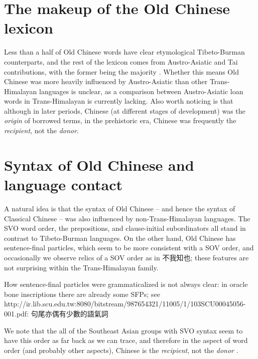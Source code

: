 \documentclass[UTF8, a4paper, oneside, scheme=plain, 12pt]{ctexrep}
\newcommand*{\citepage}[1]{p.~{#1}}
\begin{document}
\section{The makeup of the Old Chinese lexicon}

Less than a half of Old Chinese words have clear etymological Tibeto-Burman counterparts,
and the rest of the lexicon comes from Austro-Asiatic and Tai contributions,
with the former being the majority
\citep{mccraw2010lexical}.
Whether this means Old Chinese was more heavily influenced by Austro-Asiatic 
than other Trans-Himalayan languages is unclear,
as a comparison between Austro-Asiatic loan words in Trans-Himalayan is currently lacking.
Also worth noticing is that although in later periods, Chinese (at different stages of development) was the \emph{origin} of borrowed terms,
in the prehistoric era, Chinese was frequently the \emph{recipient}, not the \emph{donor}.

\section{Syntax of Old Chinese and language contact}

A natural idea is that the syntax of Old Chinese -- and hence the syntax of Classical Chinese -- 
was also influenced by non-Trans-Himalayan languages.
The SVO word order, the prepositions, and clause-initial subordinators all stand in contrast to Tibeto-Burman languages.
On the other hand, Old Chinese has sentence-final particles, which seem to be more consistent with a SOV order,
and occasionally we observe relics of a SOV order as in 不我知也;
these features are not surprising within the Trans-Himalayan family.

How sentence-final particles were grammaticalized is not always clear:
in oracle bone inscriptions there are already some SFPs;
see http://ir.lib.scu.edu.tw:8080/bitstream/987654321/11005/1/103SCU00045056-001.pdf:
句尾亦偶有少數的語氣詞

We note that the all of the Southeast Asian groups with SVO syntax seem to
have this order as far back as we can trace,
and therefore in the aspect of word order (and probably other aspects),
Chinese is the \emph{recipient}, not the \emph{donor} \citep[\citepage{82-85}]{delancey2013origins}.
\end{document}
